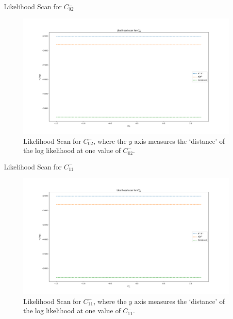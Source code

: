 \begin{frame}{Likelihood Scan for $C_{02}^{-}$}
\begin{figure}
    \centering
        \includegraphics[width=\textwidth]{2020_04_23/figs/M02.png}
    \caption{Likelihood Scan for $C_{02}^{-}$, where the $y$ axis measures the `distance' of the log likelihood at one value of $C_{02}^{-}$.}
    \label{fig:scanCM02}
\end{figure}
\end{frame}

\begin{frame}{Likelihood Scan for $C_{11}^{-}$}
\begin{figure}
    \centering
        \includegraphics[width=\textwidth]{2020_04_23/figs/M11.png}
    \caption{Likelihood Scan for $C_{11}^{-}$, where the $y$ axis measures the `distance' of the log likelihood at one value of $C_{11}^{-}$.}
    \label{fig:scanCM11}
\end{figure}
\end{frame}


